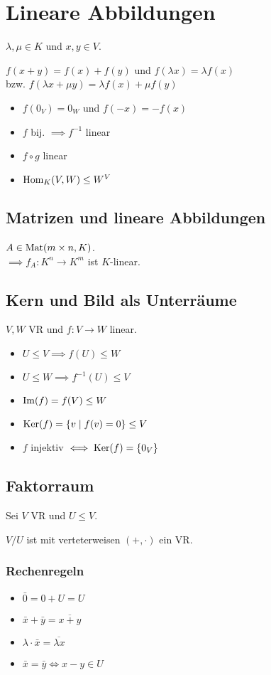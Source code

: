 \section*{Lineare Abbildungen}
$\lambda,\mu \in K$ und $x,y \in V$.

$f(x+y)=f(x)+f(y)$ und $f(\lambda x) = \lambda f(x)$ \\
bzw. $f(\lambda x + \mu y) = \lambda f(x) + \mu f (y)$

\begin{itemize}
	\item $f(0_V)=0_W$ und $f(-x) = -f(x)$
	\item $f$ bij. $\implies f^{-1}$ linear
	\item $f \circ g$ linear
	\item $\operatorname{Hom}_K(V,W) \le W^V$
\end{itemize}

\subsection*{Matrizen und lineare Abbildungen}
$A\in\operatorname{Mat}(m\times n, K)$.\\
$\implies f_A: K^n\to K^m$ ist $K$-linear.

\subsection*{Kern und Bild als Unterräume}
$V,W$ VR und $f:V\to W$ linear.
\begin{itemize}
	\item $U\le V \implies f(U)\le W$
	\item $U\le W \implies f^{-1}(U) \le V$
	\item $\operatorname{Im}(f)=f(V)\le W$
	\item $\operatorname{Ker}(f) = \{v \mid f(v)=0\} \le V$
	\item $f$ injektiv $\iff \operatorname{Ker}(f)=\{0_V\}$
\end{itemize}

\subsection*{Faktorraum}
Sei $V$ VR und $U \le V$.

$V/U$ ist mit verteterweisen $(+,\cdot)$ ein VR.

\subsubsection*{Rechenregeln}
\begin{itemize}
	\item $\bar 0 = 0 + U = U$
	\item $\bar x + \bar y = \overline{x+y}$
	\item $\lambda\cdot \bar x = \overline{\lambda x}$
	\item $\bar x = \bar y \iff x-y \in U$
\end{itemize}

